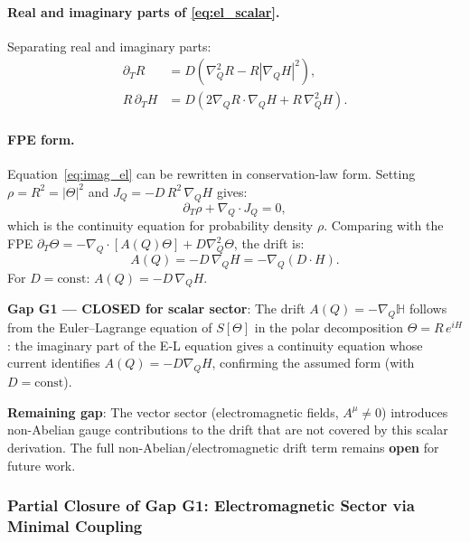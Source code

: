 \documentclass[12pt]{article}
\theoremstyle{definition}
\theoremstyle{remark}
\begin{document}
\paragraph{Real and imaginary parts of \eqref{eq:el_scalar}.}
Separating real and imaginary parts:
\begin{align}
  \partial_T R &= D\!\left(\nabla_Q^2 R - R|\nabla_Q H|^2\right), \label{eq:real_el}\\
  R\,\partial_T H &= D\!\left(2\nabla_Q R \cdot \nabla_Q H + R\,\nabla_Q^2 H\right).
  \label{eq:imag_el}
\end{align}

\paragraph{FPE form.}
Equation~\eqref{eq:imag_el} can be rewritten in conservation-law form.
Setting $\rho = R^2 = |\Theta|^2$ and $J_Q = -D\,R^2\,\nabla_Q H$ gives:
\begin{equation}
  \partial_T \rho + \nabla_Q \cdot J_Q = 0,
\end{equation}
which is the continuity equation for probability density $\rho$.
Comparing with the FPE $\partial_T\Theta = -\nabla_Q\cdot[A(Q)\Theta] + D\nabla_Q^2\Theta$, the drift is:
\begin{equation}
  \boxed{A(Q) = -D\,\nabla_Q H = -\nabla_Q(D\cdot H).}
  \label{eq:drift_derived}
\end{equation}
For $D = \mathrm{const}$: $A(Q) = -D\,\nabla_Q H$.

\begin{resultbox}
\textbf{Gap G1 — CLOSED for scalar sector}:
The drift $A(Q) = -\nabla_Q \mathbb{H}$ follows from the Euler--Lagrange equation
of $S[\Theta]$ in the polar decomposition $\Theta = R\,e^{iH}$:
the imaginary part of the E-L equation gives a continuity equation
whose current identifies $A(Q) = -D\nabla_Q H$, confirming the assumed form
(with $D = \mathrm{const}$).

\medskip
\textbf{Remaining gap}: The vector sector (electromagnetic fields, $A^\mu \neq 0$)
introduces non-Abelian gauge contributions to the drift that are not covered by
this scalar derivation.  The full non-Abelian/electromagnetic drift term remains
\textbf{open} for future work.
\end{resultbox}

\subsubsection{Partial Closure of Gap G1: Electromagnetic Sector via Minimal Coupling}
\label{subsubsec:gap_g1_em}
\end{document}
